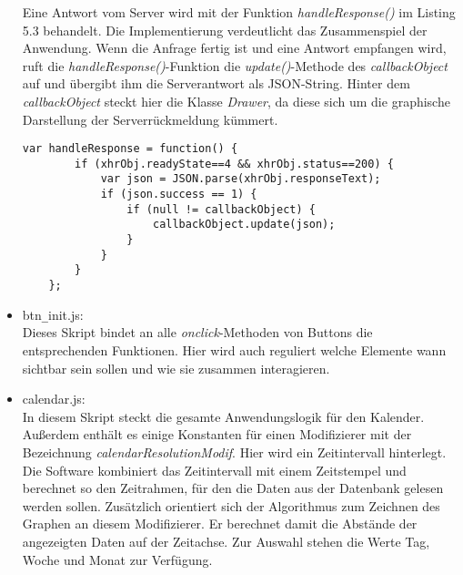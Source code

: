 \begin{itemize}
Eine Antwort vom Server wird mit der Funktion \emph{handleResponse()} im Listing 5.3 behandelt.
Die Implementierung verdeutlicht das Zusammenspiel der Anwendung.
Wenn die Anfrage fertig ist und eine Antwort empfangen wird, ruft die \emph{handleResponse()}-Funktion 
die \emph{update()}-Methode
des \emph{callbackObject} auf und \"ubergibt ihm die Serverantwort als JSON-String.
Hinter dem \emph{callbackObject} steckt hier die Klasse \emph{Drawer}, da diese sich um die 
graphische Darstellung der Serverr\"uckmeldung k\"ummert.\\

 \begin{lstlisting}[caption={handleResponse Funktion zum Abfangen von Serverantworten}]
var handleResponse = function() {        
        if (xhrObj.readyState==4 && xhrObj.status==200) {            
            var json = JSON.parse(xhrObj.responseText);
            if (json.success == 1) {                
                if (null != callbackObject) {                                        
                    callbackObject.update(json);               
                }
            }
        }       
    };
\end{lstlisting}
 
 
  
 \item btn\texttt{\_}init.js:\\
 Dieses Skript bindet an alle \emph{onclick}-Methoden von Buttons die entsprechenden Funktionen.
 Hier wird auch reguliert welche Elemente wann sichtbar sein sollen und wie sie zusammen interagieren.
 
 \item calendar.js:\\
 In diesem Skript steckt die gesamte Anwendungslogik f\"ur den Kalender.
 Au\ss{}erdem enth\"alt es einige Konstanten f\"ur einen Modifizierer mit der Bezeichnung 
 \emph{calendarResolutionModif}.
 Hier wird ein Zeitintervall hinterlegt.
 Die Software kombiniert das Zeitintervall mit einem Zeitstempel und berechnet so den Zeitrahmen, 
 f\"ur den die Daten aus der Datenbank gelesen werden sollen.
 Zus\"atzlich orientiert sich der Algorithmus zum Zeichnen des Graphen an diesem Modifizierer.
 Er berechnet damit die Abst\"ande der angezeigten Daten auf der Zeitachse. 
 Zur Auswahl stehen die Werte Tag, Woche und Monat zur Verf\"ugung.
 

\end{itemize}
